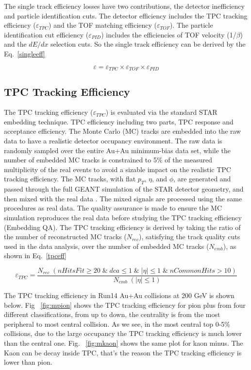 The single track efficiency losses have two contributions, the detector inefficiency and particle identification cuts. The detector efficiency includes the TPC tracking efficiency ($\varepsilon_{TPC}$) and the TOF matching efficiency ($\varepsilon_{TOF}$). The particle identification cut efficiency ($\varepsilon_{PID}$) includes the efficiencies of TOF velocity (1/$\beta$) and the $dE/dx$ selection cuts. So the single track efficiency can be derived by the Eq.~\ref{singleeff}

\begin{equation}
\varepsilon = \varepsilon_{TPC} \times \varepsilon_{TOF} \times \varepsilon_{PID}
\label{singleeff}
\end{equation}

\subsection{TPC Tracking Efficiency}

The TPC tracking efficiency ($\varepsilon_{TPC}$) is evaluated via the standard STAR embedding technique. TPC efficiency including two parts, TPC response and acceptance efficiency. The Monte Carlo (MC) tracks are embedded into the raw data to have a realistic detector occupancy environment. The raw data is randomly sampled over the entire Au+Au minimum-bias data set, while the number of embedded MC tracks is constrained to 5\% of the measured multiplicity of the real events to avoid a sizable impact on the realistic TPC tracking efficiency. The MC tracks, with flat $p_{T}$, $\eta$, and $\phi$, are generated and passed through the full GEANT simulation of the STAR detector geometry, and then mixed with the real data . The mixed signals are processed using the same procedures as real data.  The quality assurance is made to ensure the MC simulation reproduces the real data before studying the TPC tracking efficiency (Embedding QA). The TPC tracking efficiency is derived by taking the ratio of the number of reconstructed MC tracks ($N_{rec}$), satisfying the track quality cuts used in the data analysis, over the number of embedded MC tracks ($N_{emb}$), as shown in Eq.~\ref{tpceff}

\begin{equation}
\varepsilon_{TPC} = \frac{N_{rec}\;(nHitsFit\geq20\;\&\;dca\leq1\;\&\;|\eta|\leq1\;\&\;nCommonHits > 10)}{N_{emb}\;(|\eta|\leq1)}
\label{tpceff}
\end{equation}

The TPC tracking efficiency in Run14 Au+Au collisions at 200 GeV is shown below. Fig ~\ref{fig:mpion} shows the TPC tracking efficiency for pion plus from four different classifications, from up to down, the centrality is from the most peripheral to most central collision. As we see, in the most central top 0-5\% collisions, due to the large occupancy the TPC tracking efficiency is much lower than the central one. Fig. ~\ref{fig:mkaon} shows the same plot for kaon minus. The Kaon can be decay inside TPC, that's the reason the TPC tracking efficiency is lower than pion.

